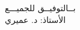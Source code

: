 \documentclass[a4paper,14pt]{article}
\begin{document}
	\\
	\\
	\\
	\\
	\\
	\\
	\\
	\\
	\\
	\\
	\\
	\\
	\\
	\\
	\\
	\\
	\\
	\\
	\\
	
	\begin{flushleft}
		بــالتوفيــق للجميـــع\\
		الأستاذ: د. عميري
		
	\end{flushleft}
	
\end{document}
